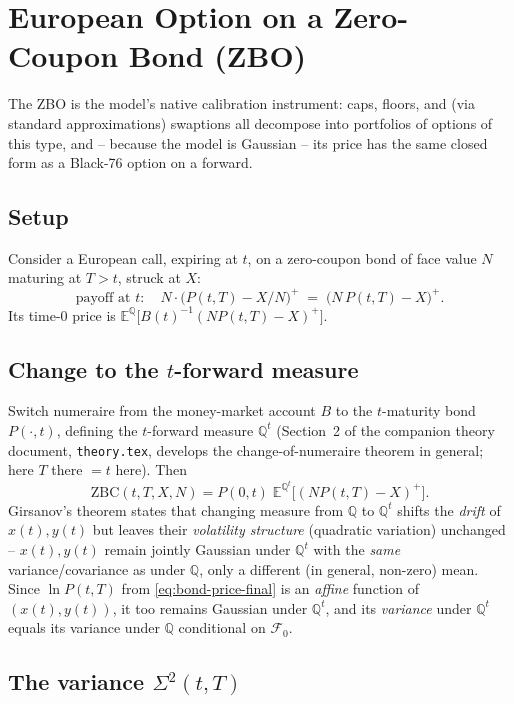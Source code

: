 \documentclass[11pt,a4paper]{article}
\newcommand{\E}{\mathbb{E}}
\newcommand{\Q}{\mathbb{Q}}
\newcommand{\Qt}{\mathbb{Q}^t}
\newcommand{\F}{\mathcal{F}}
\newcommand{\coderef}[1]{\texttt{\color{blue!60!black}#1}}
\theoremstyle{definition}
\begin{document}
\section{European Option on a Zero-Coupon Bond (ZBO)}
\label{sec:zbo}

The ZBO is the model's native calibration instrument: caps, floors, and (via
standard approximations) swaptions all decompose into portfolios of options
of this type, and -- because the model is Gaussian -- its price has the same
closed form as a Black-76 option on a forward.

\subsection{Setup}

Consider a European call, expiring at $t$, on a zero-coupon bond of face
value $N$ maturing at $T>t$, struck at $X$:
\[
  \text{payoff at } t: \quad N\cdot\bigl(P(t,T)-X/N\bigr)^+ \;=\; \bigl(N\,P(t,T)-X\bigr)^+.
\]
Its time-0 price is $\E^\Q\bigl[B(t)^{-1}(N P(t,T)-X)^+\bigr]$.

\subsection{Change to the $t$-forward measure}

Switch numeraire from the money-market account $B$ to the $t$-maturity bond
$P(\cdot,t)$, defining the $t$-forward measure $\Qt$ (Section~2 of the
companion theory document, \coderef{theory.tex}, develops the
change-of-numeraire theorem in general; here $T$ there $=t$ here). Then
\[
  \text{ZBC}(t,T,X,N) = P(0,t)\;\E^{\Qt}\!\bigl[(N P(t,T)-X)^+\bigr].
\]
Girsanov's theorem states that changing measure from $\Q$ to $\Qt$ shifts the
\emph{drift} of $x(t),y(t)$ but leaves their \emph{volatility structure}
(quadratic variation) unchanged -- $x(t),y(t)$ remain jointly Gaussian under
$\Qt$ with the \emph{same} variance/covariance as under $\Q$, only a
different (in general, non-zero) mean. Since $\ln P(t,T)$ from
\eqref{eq:bond-price-final} is an \emph{affine} function of $(x(t),y(t))$,
it too remains Gaussian under $\Qt$, and its \emph{variance} under $\Qt$
equals its variance under $\Q$ conditional on $\F_0$.

\subsection{The variance $\Sigma^2(t,T)$}
\label{sec:sigma2-derivation}
\end{document}

